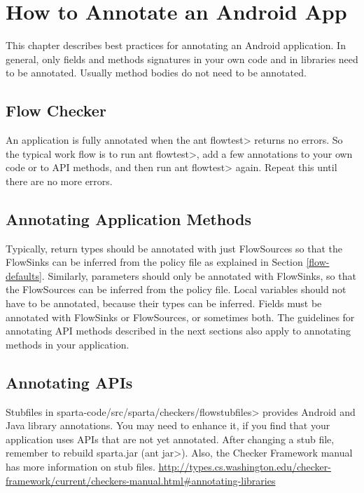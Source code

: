 \htmlhr
\chapter{How to Annotate an Android App\label{app-annotation}}

This chapter describes best practices for annotating an Android application.  In general, only 
fields and methods signatures in your own code and in libraries need to be annotated. Usually method bodies do not need to be annotated.

\section{Flow Checker\label{flowchecker}}
An application is fully annotated when the \<ant flowtest> returns no errors.  So the typical work flow is 
to run \<ant flowtest>, add a few annotations to your own code or to API methods, and then run \<ant flowtest> again.  
Repeat this until there are no more errors.



\section{Annotating Application Methods\label{sec:annomethods}}

Typically, return types should be annotated with just FlowSources so that the FlowSinks can be
 inferred from the policy file as explained in Section \ref{flow-defaults}. Similarly, parameters should
  only be annotated with FlowSinks, so that the FlowSources can be inferred from  the policy file.
    Local variables should not have to be annotated, because their types can be inferred. Fields 
    must be annotated with  FlowSinks or FlowSources, or sometimes both. The guidelines for annotating 
    API methods described in the next sections also apply to annotating methods in your application. 


\section{Annotating APIs\label{sec:annotatedAPI}}

Stubfiles in  \<sparta-code/src/sparta/checkers/flowstubfiles> provides Android and Java
library annotations.  You may need to enhance it, if you find that your application
uses APIs that are not yet annotated.  After changing a stub file, remember to rebuild sparta.jar (\<ant jar>).
Also, the Checker Framework manual has more information on stub files. 
\url{http://types.cs.washington.edu/checker-framework/current/checkers-manual.html#annotating-libraries}

